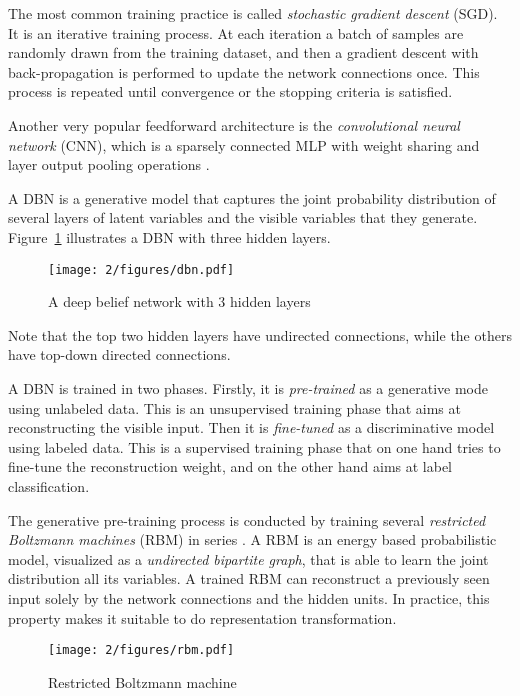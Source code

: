 The most common training practice is called {\it stochastic gradient descent} (SGD). It is an iterative training process. At each iteration a batch of samples are randomly drawn from the training dataset, and then a gradient descent with back-propagation is performed to update the network connections once. This process is repeated until convergence or the stopping criteria is satisfied.

Another very popular feedforward architecture is the {\it convolutional neural network} (CNN), which is a sparsely connected MLP with weight sharing and layer output pooling operations \cite{lecun1995convolutional}.

A DBN is a generative model that captures the joint probability distribution of several layers of latent variables and the visible variables that they generate. Figure~\ref{fig:2-dbn} illustrates a DBN with three hidden layers.
\begin{figure}[htb]
\centering
\texttt{[image: 2/figures/dbn.pdf]}
\caption{A deep belief network with 3 hidden layers}
\label{fig:2-dbn}
\end{figure}
Note that the top two hidden layers have undirected connections, while the others have top-down directed connections.

A DBN is trained in two phases. Firstly, it is {\it pre-trained} as a generative mode using unlabeled data. This is an unsupervised training phase that aims at reconstructing the visible input. Then it is {\it fine-tuned} as a discriminative model using labeled data. This is a supervised training phase that on one hand tries to fine-tune the reconstruction weight, and on the other hand aims at label classification.


The generative pre-training process is conducted by training several {\it restricted Boltzmann machines} (RBM) in series \cite{hinton2006fast}. A RBM \cite{smolensky1986information} is an energy based probabilistic model, visualized as a {\it undirected bipartite graph}, that is able to learn the joint distribution all its variables. A trained RBM can reconstruct a previously seen input solely by the network connections and the hidden units. In practice, this property makes it suitable to do representation transformation.
\begin{figure}[htb]
\centering
\texttt{[image: 2/figures/rbm.pdf]}
\caption{Restricted Boltzmann machine}
\label{fig:2-rbm}
\end{figure}

